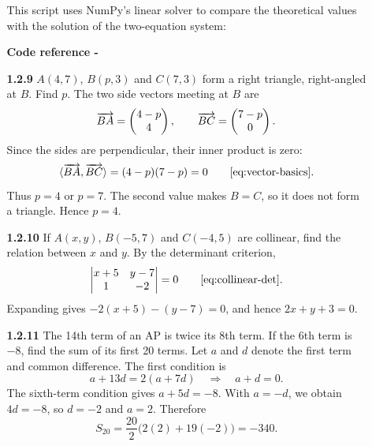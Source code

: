 \begin{enumerate}[label={},leftmargin=0pt]
\begin{enumerate}[label={},leftmargin=0pt,itemsep=9pt]
This script uses NumPy's linear solver to compare the theoretical values with the solution of the two-equation system:
\par\smallskip
\noindent\textbf{Code reference -}
\par\noindent{}
\par\smallskip
\setcounter{enumii}{9}
\setcounter{equation}{0}
\item[\textbf{1.2.9}] $A(4,7)$, $B(p,3)$ and $C(7,3)$ form a right triangle, right-angled at $B$. Find $p$.
\solution The two side vectors meeting at $B$ are
\begin{equation}
\overrightarrow{BA}=\begin{pmatrix}4-p\\4\end{pmatrix},\qquad \overrightarrow{BC}=\begin{pmatrix}7-p\\0\end{pmatrix}.
\end{equation}
Since the sides are perpendicular, their inner product is zero:
\begin{equation}
\langle\overrightarrow{BA},\overrightarrow{BC}\rangle=(4-p)(7-p)=0\qquad\eqref{eq:vector-basics}.
\end{equation}
Thus $p=4$ or $p=7$. The second value makes $B=C$, so it does not form a triangle. Hence $p=4$.




\setcounter{enumii}{10}
\setcounter{equation}{0}
\item[\textbf{1.2.10}] If $A(x,y)$, $B(-5,7)$ and $C(-4,5)$ are collinear, find the relation between $x$ and $y$.
\solution By the determinant criterion,
\begin{equation}
\begin{vmatrix}x+5&y-7\\1&-2\end{vmatrix}=0\qquad\eqref{eq:collinear-det}.
\end{equation}
Expanding gives $-2(x+5)-(y-7)=0$, and hence $2x+y+3=0$.



\newpage
\setcounter{enumii}{11}
\setcounter{equation}{0}
\item[\textbf{1.2.11}] The 14th term of an AP is twice its 8th term. If the 6th term is $-8$, find the sum of its first 20 terms.
\solution Let $a$ and $d$ denote the first term and common difference. The first condition is
\begin{equation}
a+13d=2(a+7d)\quad\Longrightarrow\quad a+d=0.
\end{equation}
The sixth-term condition gives $a+5d=-8$. With $a=-d$, we obtain $4d=-8$, so $d=-2$ and $a=2$. Therefore
\begin{equation}
S_{20}=\frac{20}{2}\bigl(2(2)+19(-2)\bigr)=-340.
\end{equation}




\end{enumerate}
\end{enumerate}
